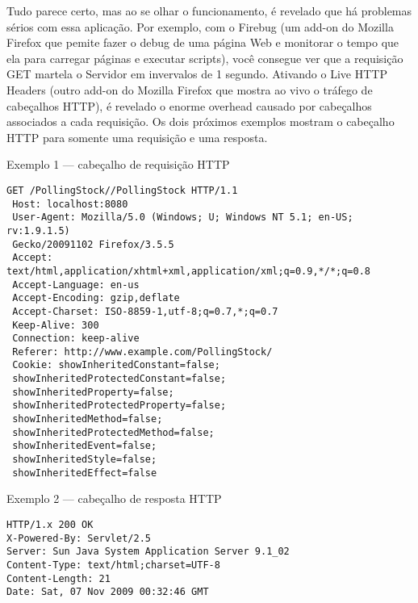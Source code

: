 \documentclass[a4paper,12pt]{article}
\begin{document}
Tudo parece certo, mas ao se olhar o funcionamento, é revelado que há problemas sérios com essa aplicação. Por exemplo, com o Firebug (um add-on do Mozilla Firefox que pemite fazer o debug de uma página Web e monitorar o tempo que ela para carregar páginas e executar scripts), você consegue ver que a requisição GET martela o Servidor em invervalos de 1 segundo. Ativando o Live HTTP Headers (outro add-on do Mozilla Firefox que mostra ao vivo o tráfego de cabeçalhos HTTP), é revelado o enorme overhead causado por cabeçalhos associados a cada requisição. Os dois próximos exemplos mostram o cabeçalho HTTP para somente uma requisição e uma resposta.

Exemplo 1 — cabeçalho de requisição HTTP
\begin{small}
\begin{Verbatim}[frame=single]
 GET /PollingStock//PollingStock HTTP/1.1
 Host: localhost:8080
 User-Agent: Mozilla/5.0 (Windows; U; Windows NT 5.1; en-US; rv:1.9.1.5)
 Gecko/20091102 Firefox/3.5.5
 Accept: text/html,application/xhtml+xml,application/xml;q=0.9,*/*;q=0.8
 Accept-Language: en-us
 Accept-Encoding: gzip,deflate
 Accept-Charset: ISO-8859-1,utf-8;q=0.7,*;q=0.7
 Keep-Alive: 300
 Connection: keep-alive
 Referer: http://www.example.com/PollingStock/
 Cookie: showInheritedConstant=false;
 showInheritedProtectedConstant=false;
 showInheritedProperty=false;
 showInheritedProtectedProperty=false;
 showInheritedMethod=false;
 showInheritedProtectedMethod=false;
 showInheritedEvent=false;
 showInheritedStyle=false;
 showInheritedEffect=false
\end{Verbatim}
\end{small}

Exemplo 2 — cabeçalho de resposta HTTP
\begin{small}
\begin{Verbatim}[frame=single]
HTTP/1.x 200 OK
X-Powered-By: Servlet/2.5
Server: Sun Java System Application Server 9.1_02
Content-Type: text/html;charset=UTF-8
Content-Length: 21
Date: Sat, 07 Nov 2009 00:32:46 GMT
\end{Verbatim}
\end{small}
\end{document}
